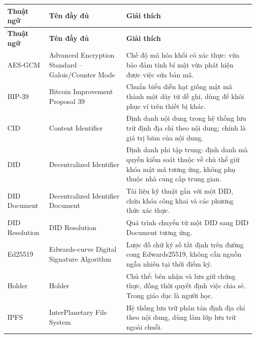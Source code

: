 
\renewcommand{\arraystretch}{1.3}

\begin{longtable}{p{} p{} p{}}

\textbf{Thuật ngữ} & \textbf{Tên đầy đủ} & \textbf{Giải thích} \\
\endfirsthead

\textbf{Thuật ngữ} & \textbf{Tên đầy đủ} & \textbf{Giải thích} \\
\endhead

AES-GCM & Advanced Encryption Standard -- Galois/Counter Mode & Chế độ mã hóa khối có xác thực: vừa bảo đảm tính bí mật vừa phát hiện được việc sửa bản mã. \\

BIP-39 & Bitcoin Improvement Proposal 39 & Chuẩn biểu diễn hạt giống mật mã thành một dãy từ dễ ghi, dùng để khôi phục ví trên thiết bị khác. \\

CID & Content Identifier & Định danh nội dung trong hệ thống lưu trữ định địa chỉ theo nội dung; chính là giá trị băm của nội dung. \\

DID & Decentralized Identifier & Định danh phi tập trung: định danh mà quyền kiểm soát thuộc về chủ thể giữ khóa mật mã tương ứng, không phụ thuộc nhà cung cấp trung gian. \\

DID Document & Decentralized Identifier Document & Tài liệu kỹ thuật gắn với một DID, chứa khóa công khai và các phương thức xác thực. \\

DID Resolution & DID Resolution & Quá trình chuyển từ một DID sang DID Document tương ứng. \\

Ed25519 & Edwards-curve Digital Signature Algorithm & Lược đồ chữ ký số tất định trên đường cong Edwards25519, không cần nguồn ngẫu nhiên tại thời điểm ký. \\

Holder & Holder & Chủ thể: bên nhận và lưu giữ chứng thực, đồng thời quyết định việc chia sẻ. Trong giáo dục là người học. \\

IPFS & InterPlanetary File System & Hệ thống lưu trữ phân tán định địa chỉ theo nội dung, dùng làm lớp lưu trữ ngoài chuỗi. \\


\end{longtable}
